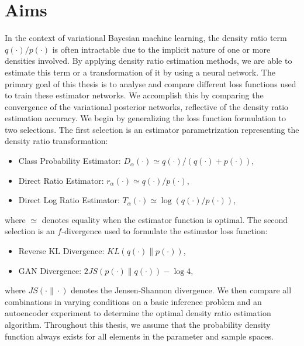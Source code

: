 \documentclass[honours,12pt, twoside]{unswthesis}
\numberwithin{equation}{section}
\theoremstyle{definition}
\begin{document}
\section{Aims}
In the context of variational Bayesian machine learning, the density ratio term $q(\cdot)/p(\cdot)$ is often intractable due to the implicit nature of one or more densities involved. By applying density ratio estimation methods, we are able to estimate this term or a transformation of it by using a neural network. The primary goal of this thesis is to analyse and compare different loss functions used to train these estimator networks. We accomplish this by comparing the convergence of the variational posterior networks, reflective of the density ratio estimation accuracy. We begin by generalizing the loss function formulation to two selections. The first selection is an estimator parametrization representing the density ratio transformation:
\begin{itemize}
\item Class Probability Estimator: $D_\alpha(\cdot)\simeq q(\cdot)/(q(\cdot)+p(\cdot))$,
\item Direct Ratio Estimator: $r_\alpha(\cdot)\simeq q(\cdot)/p(\cdot)$,
\item Direct Log Ratio Estimator: $T_\alpha(\cdot)\simeq \log (q(\cdot)/p(\cdot))$,
\end{itemize} 
where $\simeq$ denotes equality when the estimator function is optimal. The second selection is an $f$-divergence used to formulate the estimator loss function:
\begin{itemize}
\item Reverse KL Divergence: $KL(q(\cdot)\|p(\cdot))$,
\item GAN Divergence: $2JS(p(\cdot)\|q(\cdot))-\log 4$,
\end{itemize}
where $JS(\cdot \| \cdot)$ denotes the Jensen-Shannon divergence. We then compare all combinations in varying conditions on a basic inference problem and an autoencoder experiment to determine the optimal density ratio estimation algorithm. Throughout this thesis, we assume that the probability density function always exists for all elements in the parameter and sample spaces.
\end{document}
